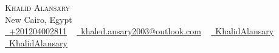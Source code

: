 \documentclass[letterpaper,11pt]{article}
\begin{document}
\begin{center}
    {\Huge \scshape Khalid Alansary} \\ \vspace{1pt}
    New Cairo, Egypt \\ \vspace{1pt}
    \small \href{tel:+201204002811}{\raisebox{-0.1\height}\faPhone\ \underline{+201204002811}} ~ \href{mailto:khalid.ansary2003@outlook.com}{\raisebox{-0.2\height}\faEnvelope\  \underline{khaled.ansary2003@outlook.com}} ~ 
    \href{https://www.linkedin.com/in/khalidalansary/}{\raisebox{-0.2\height}\faLinkedin\ \underline{KhalidAlansary}}  ~
    \href{https://github.com/khalidAlansary/}{\raisebox{-0.2\height}\faGithub\ \underline{KhalidAlansary}}
    \vspace{-8pt}
\end{center}


\end{document}
